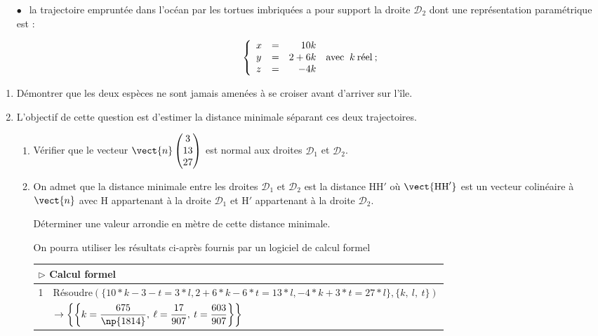 \documentclass{cornouaille}
\begin{document}
\begin{exercice}
\begin{itemize}
\item[$\bullet~~$] la trajectoire empruntée dans l'océan par les tortues imbriquées a pour support la droite $\mathcal{D}_2$ dont une représentation paramétrique est :

\[\left\{\begin{array}{l c r}
x&=&10k\\
y&=&2 + 6k\\ 
z&=&- 4k
\end{array}\right.\:\text{avec } \:k\: \text{réel}\: ;\]
\end{itemize}
\setlength\parindent{0mm}

\smallskip

\begin{enumerate}
\item Démontrer que les deux espèces ne sont jamais amenées à se croiser avant d'arriver sur l'île.
\item L'objectif de cette question est d'estimer la distance minimale séparant ces deux
trajectoires.
	\begin{enumerate}
		\item Vérifier que le vecteur $\vect{n}\begin{pmatrix}3\\13\\27\end{pmatrix}$ est normal aux droites $\mathcal{D}_1$ et $\mathcal{D}_2$.
		\item On admet que la distance minimale entre les droites $\mathcal{D}_1$ et $\mathcal{D}_2$ est la distance HH$'$ où $\vect{\text{HH}'}$ est un vecteur colinéaire à $\vect{n}$ avec H appartenant à la droite $\mathcal{D}_1$ et H$'$ appartenant à la droite $\mathcal{D}_2$.

Déterminer une valeur arrondie en mètre de cette distance minimale.

On pourra utiliser les résultats ci-après fournis par un logiciel de calcul formel

\begin{tabularx}{\linewidth}{|c|X|}\hline
\multicolumn{2}{|l|}{$\triangleright$ Calcul formel}\\ \hline
1	&Résoudre$(\{10*k-3-t=3*l,2 + 6*k - 6*t = 13*l,- 4*k + 3*t= 27*l\},\{k,~l,~t\})$\\ 
	&$\to \left\{\left\{k = \dfrac{675}{\np{1814}},\:\ell = \dfrac{17}{907}, \: t =\dfrac{603}{907}\right\}\right\}$\\ \hline
\end{tabularx}


\end{enumerate}
\end{enumerate}
\end{exercice}
\end{document}

